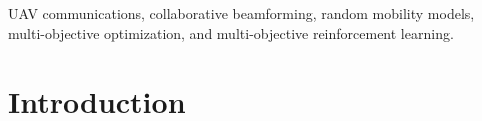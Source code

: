 \documentclass[10pt,journal,compsoc]{IEEEtran}
\begin{document}
{\begin{abstract}

\end{abstract}

%
%
\begin{IEEEkeywords}
UAV communications, collaborative beamforming, random mobility models, multi-objective optimization, and multi-objective reinforcement learning.
\end{IEEEkeywords}
}
\maketitle
%
%
\section{Introduction}
\label{sec:Introduction}
\end{document}
